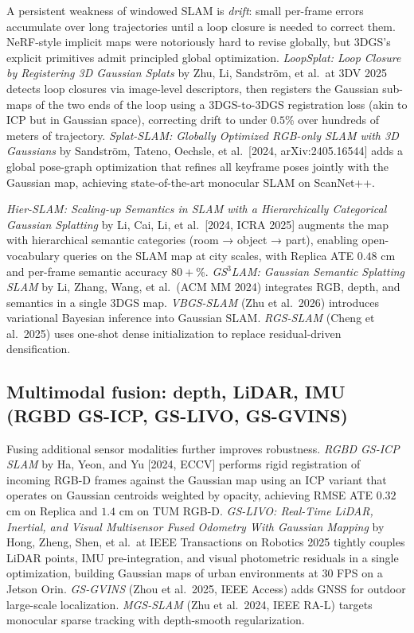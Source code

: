 \documentclass{article}
\begin{document}
A persistent weakness of windowed SLAM is \emph{drift}: small per-frame errors accumulate over long trajectories until a loop closure is needed to correct them. NeRF-style implicit maps were notoriously hard to revise globally, but 3DGS's explicit primitives admit principled global optimization. \emph{LoopSplat: Loop Closure by Registering 3D Gaussian Splats} by Zhu, Li, Sandström, et al.~at 3DV 2025 \cite{zhu2025loopsplatloopclosu} detects loop closures via image-level descriptors, then registers the Gaussian sub-maps of the two ends of the loop using a 3DGS-to-3DGS registration loss (akin to ICP but in Gaussian space), correcting drift to under \(0.5\)\% over hundreds of meters of trajectory. \emph{Splat-SLAM: Globally Optimized RGB-only SLAM with 3D Gaussians} by Sandström, Tateno, Oechsle, et al.~{[}2024, arXiv:2405.16544{]} adds a global pose-graph optimization that refines all keyframe poses jointly with the Gaussian map, achieving state-of-the-art monocular SLAM on ScanNet++.

\emph{Hier-SLAM: Scaling-up Semantics in SLAM with a Hierarchically Categorical Gaussian Splatting} by Li, Cai, Li, et al.~{[}2024, ICRA 2025{]} augments the map with hierarchical semantic categories (room → object → part), enabling open-vocabulary queries on the SLAM map at city scales, with Replica ATE \(0.48\) cm and per-frame semantic accuracy \(80+\)\%. \emph{GS\(^{3}\)LAM: Gaussian Semantic Splatting SLAM} by Li, Zhang, Wang, et al.~(ACM MM 2024) integrates RGB, depth, and semantics in a single 3DGS map. \emph{VBGS-SLAM} (Zhu et al.~2026) introduces variational Bayesian inference into Gaussian SLAM. \emph{RGS-SLAM} (Cheng et al.~2025) uses one-shot dense initialization to replace residual-driven densification.

\subsection{Multimodal fusion: depth, LiDAR, IMU (RGBD GS-ICP, GS-LIVO, GS-GVINS)}\label{multimodal-fusion-depth-lidar-imu-rgbd-gs-icp-gs-livo-gs-gvins}

Fusing additional sensor modalities further improves robustness. \emph{RGBD GS-ICP SLAM} by Ha, Yeon, and Yu {[}2024, ECCV{]} performs rigid registration of incoming RGB-D frames against the Gaussian map using an ICP variant that operates on Gaussian centroids weighted by opacity, achieving RMSE ATE \(0.32\) cm on Replica and \(1.4\) cm on TUM RGB-D. \emph{GS-LIVO: Real-Time LiDAR, Inertial, and Visual Multisensor Fused Odometry With Gaussian Mapping} by Hong, Zheng, Shen, et al.~at IEEE Transactions on Robotics 2025 \cite{hong2025gslivorealtimelida} tightly couples LiDAR points, IMU pre-integration, and visual photometric residuals in a single optimization, building Gaussian maps of urban environments at \(30\) FPS on a Jetson Orin. \emph{GS-GVINS} (Zhou et al.~2025, IEEE Access) adds GNSS for outdoor large-scale localization. \emph{MGS-SLAM} (Zhu et al.~2024, IEEE RA-L) targets monocular sparse tracking with depth-smooth regularization.
\end{document}
